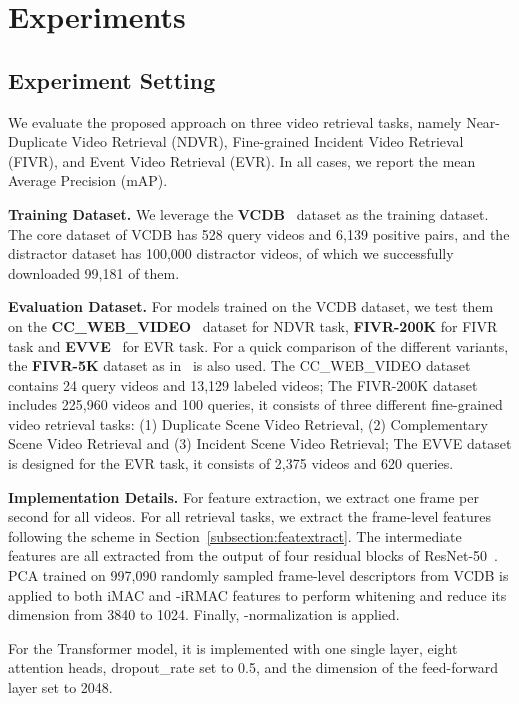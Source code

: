 \documentclass[10pt,twocolumn,letterpaper]{article}
\begin{document}
\section{Experiments} \label{section:experiments}
\subsection{Experiment Setting} \label{subsection:expsetting}
We evaluate the proposed approach on three video retrieval tasks, namely Near-Duplicate Video Retrieval (NDVR), Fine-grained Incident Video Retrieval (FIVR), and Event Video Retrieval (EVR). In all cases, we report the mean Average Precision (mAP).

\textbf{Training Dataset.}
We leverage the \textbf{VCDB}~\cite{jiang2014vcdb} dataset as the training dataset. The core dataset of VCDB has 528 query videos and 6,139 positive pairs, and the distractor dataset has 100,000 distractor videos, of which we successfully downloaded 99,181 of them.

\textbf{Evaluation Dataset.}
For models trained on the VCDB dataset, we test them on the \textbf{CC\_WEB\_VIDEO}~\cite{wu2007practical} dataset for NDVR task, \textbf{FIVR-200K} for FIVR task and \textbf{EVVE}~\cite{revaud2013event} for EVR task. For a quick comparison of the different variants, the \textbf{FIVR-5K} dataset as in~\cite{kordopatis2019visil} is also used. 
The CC\_WEB\_VIDEO dataset contains 24 query videos and 13,129 labeled videos;
The FIVR-200K dataset includes 225,960 videos and 100 queries, it consists of three different fine-grained video retrieval tasks: (1) Duplicate Scene Video Retrieval, (2) Complementary Scene Video Retrieval and (3) Incident Scene Video Retrieval;
The EVVE dataset is designed for the EVR task, it consists of 2,375 videos and 620 queries.

\textbf{Implementation Details.}
For feature extraction, we extract one frame per second for all videos. For all retrieval tasks, we extract the frame-level features following the scheme in Section~\ref{subsection:featextract}. The intermediate features are all extracted from the output of four residual blocks of ResNet-50~\cite{he2016deep}. PCA trained on 997,090 randomly sampled frame-level descriptors from VCDB is applied to both iMAC and -iRMAC features to perform whitening and reduce its dimension from 3840 to 1024. Finally, -normalization is applied.

For the Transformer model, it is implemented with one single layer, eight attention heads, dropout\_rate set to 0.5, and the dimension of the feed-forward layer set to 2048.
\end{document}
